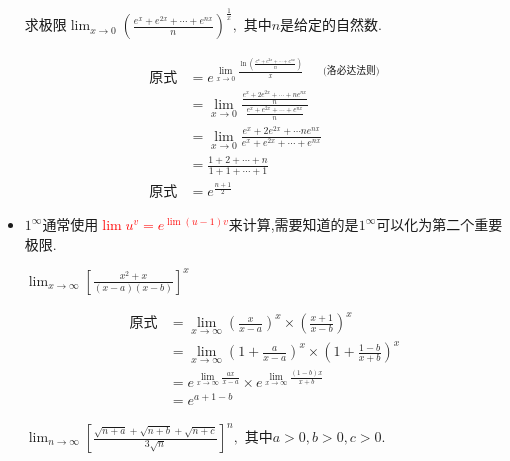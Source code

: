 \documentclass[12pt, a4paper, oneside, UTF8]{ctexbook}  %
\begin{document}
\begin{itemize}
          \begin{problem}
          求极限$\lim_{x\to0}\left(\frac{e^x+e^{2x}+\cdots+e^{nx}}n\right)^{\frac{1}{x}},$ 其中$n$是给定的自然数.
          \end{problem}
          \begin{solution}
              \begin{align*}
                  \text{原式} & = e^{\lim_{x \to 0} \frac{\ln \left(\frac{e^x+e^{2x}+\cdots+e^{nx}}n\right)}{x}\qquad \text{(洛必达法则)} } \\
                            & =\lim_{x\to0}\frac{\frac{e^{x}+2e^{2x}+\cdots+ne^{nx}}{n}}{\frac{e^{x}+e^{2x}+\cdots+e^{nx}}{n}}       \\
                            & = \lim_{x\to0}\frac{e^{x}+2e^{2x}+\cdots ne^{nx}}{e^{x}+e^{2x}+\cdots+e^{nx}}                          \\
                            & =\frac{1+2+\cdots+n}{1+1+\cdots+1}                                                                     \\
                  \text{原式} & = e^{\frac{n+1}{2}}
              \end{align*}
          \end{solution}
    \item $1 ^ \infty$通常使用\textcolor{red}{$\lim u^v=e^{\lim (u-1)v}$}来计算,需要知道的是$1^\infty$可以化为第二个重要极限.
          \begin{problem}
          $\lim _{x \to \infty}\left[ \frac{x^2 + x}{(x-a)(x-b)}\right]^x$
          \end{problem}
          \begin{solution}
              \begin{align*}
                  \text{原式} & = \lim _{x \to \infty} \left(\frac{x}{x-a}\right)^x \times \left(\frac{x+1}{x-b}\right)^x         \\
                            & =  \lim _{x \to \infty} \left(1+\frac{a}{x-a} \right)^x \times \left( 1+\frac{1-b}{x+b} \right)^x \\
                            & = e^{\lim _{x \to \infty} \frac{ax}{x-a} } \times e^{\lim _{x \to \infty} \frac{(1-b)x}{x+b}}     \\
                            & =e^{a+1-b}
              \end{align*}
          \end{solution}
          \begin{problem}
          $\lim_{n\to\infty}\left[\frac{\sqrt{n+a}+\sqrt{n+b}+\sqrt{n+c}}{3\sqrt{n}}\right]^n,\text{ 其中}a>0,b>0,c>0.$

\end{problem}
\end{itemize}
\end{document}
